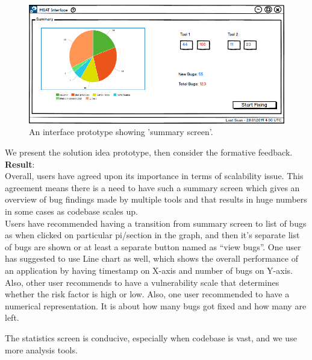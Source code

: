 \begin{figure}[hbt!]
	\centering
	\includegraphics[width=\linewidth]{figures/ux1_summary_screen}
	\caption{An interface prototype showing 'summary screen'.}
	\label{fig:ux1_summary_screen}
\end{figure}

We present the solution idea prototype, then consider the formative feedback. \\

\textbf{Result}: \\

Overall, users have agreed upon its importance in terms of scalability issue. This agreement means there is a need to have such a summary screen which gives an overview of bug findings made by multiple tools and that results in huge numbers in some cases as codebase scales up. \\

Users have recommended having a transition from summary screen to list of bugs as when clicked on particular pi/section in the graph, and then it’s separate list of bugs are shown or at least a separate button named as “view bugs”. One user has suggested to use Line chart as well, which shows the overall performance of an application by having timestamp on X-axis and number of bugs on Y-axis. Also, other user recommends to have a vulnerability scale that determines whether the risk factor is high or low. Also, one user recommended to have a numerical representation. It is about how many bugs got fixed and how many are left. \\

\begin{myboxi}
	The statistics screen is conducive, especially when codebase is vast, and we use more analysis tools.
\end{myboxi}
\hfill \break
